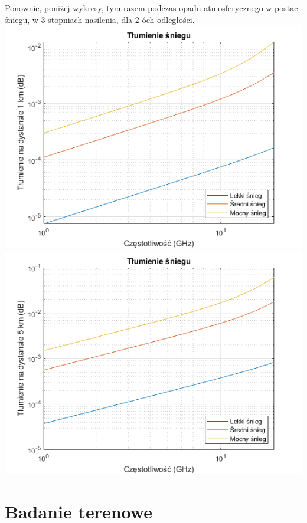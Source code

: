 Ponownie, poniżej wykresy, tym razem podczas opadu atmosferycznego w postaci śniegu, w 3 stopniach nasilenia, dla 2-óch odległości.
\includegraphics{./grafika/num_sim3_tlumienie_podczas_opadu_sniegu_1km.png}
\includegraphics{./grafika/num_sim4_tlumienie_podczas_opadu_sniegu_5km.png}
\pagebreak
\section{Badanie terenowe}\cite{pico2024}